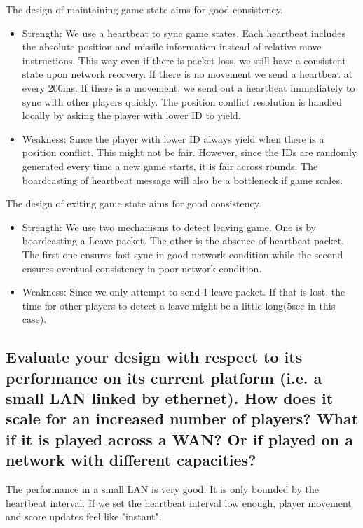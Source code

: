\documentclass[11pt]{article} %
\begin{document}
The design of maintaining game state aims for good consistency.
\begin{itemize}
    \item Strength: We use a heartbeat to sync game states. Each heartbeat includes
        the absolute position and missile information instead of 
        relative move instructions. This way even if there is packet loss, we still
        have a consistent state upon network recovery. If there is no movement we
        send a heartbeat at every 200ms. If there is a movement, we send out a heartbeat
        immediately to sync with other players quickly. The position conflict resolution
        is handled locally by asking the player with lower ID to yield.

    \item Weakness: Since the player with lower ID always yield 
        when there is a position conflict. This might not be fair. 
        However, since the IDs are randomly generated every time a new game starts, 
        it is fair across rounds. 
        The boardcasting of heartbeat message will also be a bottleneck if game scales.
\end{itemize}

The design of exiting game state aims for good consistency.
\begin{itemize}
    \item Strength: We use two mechanisms to detect leaving game. One is by boardcasting
        a Leave packet. The other is the absence of heartbeat packet. The first one ensures
        fast sync in good network condition while the second ensures eventual consistency 
        in poor network condition.
    \item Weakness: Since we only attempt to send 1 leave packet. If that is lost, the time
        for other players to detect a leave might be a little long(5sec in this case).
\end{itemize}

\subsection{
Evaluate your design with respect to its performance on its current platform 
(i.e. a small LAN linked by ethernet). How does it scale for an increased 
number of players? What if it is played across a WAN?
Or if played on a network with different capacities?
}
The performance in a small LAN is very good. It is only bounded by the heartbeat interval.
If we set the heartbeat interval low enough, player movement and score updates feel like "instant".
\end{document}
